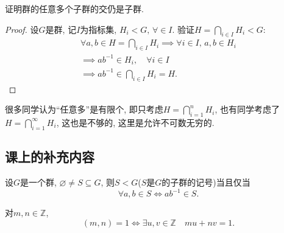 \documentclass{../solutions-cn}
\begin{document}
\begin{exercise}[习题1.3.12]
    证明群的任意多个子群的交仍是子群.
\end{exercise}

\begin{proof}
    设$G$是群, 记$I$为指标集, $H_i < G,\, \forall \in I$. 验证\(H = \bigcap_{i \in I} H_i < G\):
    \[
    \begin{gathered}
        \forall a, b \in H = \bigcap_{i \in I} H_i \implies \forall i \in I,\,a, b \in H_i\\
        \implies ab^{-1} \in H_i, \quad \forall i \in I\\
        \implies ab^{-1} \in \bigcap_{i \in I} H_i = H.
    \end{gathered}
    \]
\end{proof}

\begin{remark}
    很多同学认为“任意多”是有限个, 即只考虑\(H = \bigcap_{i = 1}^{n} H_i\), 也有同学考虑了\(H = \bigcap_{i = 1}^{\infty} H_i\), 这也是不够的, 这里是允许不可数无穷的.
\end{remark}

\subsection*{课上的补充内容}

\begin{additional}[子群的判定]
    设$G$是一个群, $\varnothing \neq S \subseteq G$, 则$S < G$($S$是$G$的子群的记号)当且仅当
    \[
        \forall a, b \in S \iff ab^{-1} \in S.
    \]
\end{additional}

\begin{additional}
    对$m, n \in \mathbb{Z}$,
    \[
        (m, n) = 1 \iff \exists u, v \in \mathbb{Z} \quad mu + nv = 1.
    \]
\end{additional}
\end{document}
